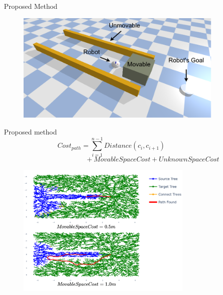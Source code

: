 \begin{frame}[fragile]{Proposed Method} 
\begin{center}
\begin{figure}[H]
\includegraphics[width=0.9\textwidth]{figures/proposed_method/push_or_drive}
\end{figure}
\end{center}
\end{frame}

\begin{frame}[fragile]{Proposed method} 
  \[\mathit{Cost_{path}} =  \sum_{i=1}^{n-1} \mathit{Distance}(c_i, c_{i+1}) \hspace{2cm}\]
  \[\hspace{3cm}+ \mathit{MovableSpaceCost} + \mathit{UnknownSpaceCost} \]
\end{frame}


\begin{frame}[fragile]{}
\begin{center}
\begin{figure}[H]
\vspace{-0.3cm}
\hspace{0.9cm}
\includegraphics[width=0.765\textwidth]{figures/proposed_method/push_or_drive_planned.drawio.png} 
\end{figure}
\end{center}
\end{frame}
